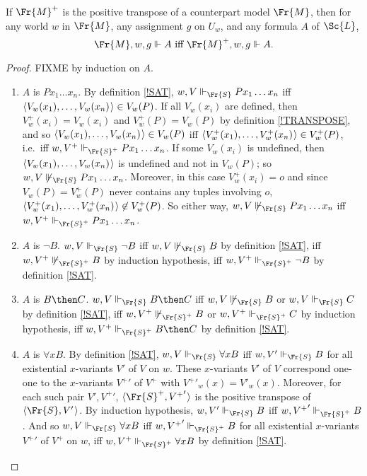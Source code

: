 \documentclass[11pt]{woarticle}
\theoremstyle{break}
\theoremstyle{nonumberplain}
\newcommand{\SAT}{\Vdash}
\newcommand{\1}{\;\,|\;\,}
\renewcommand{\t}[1]{\ensuremath{\langle #1  \makebox[.2ex]{}\rangle}}
\begin{document}
\begin{lemma}{\label{transpose}}
  If $\Fr{M}^{+}$ is the positive transpose of a counterpart model $\Fr{M}$,
  then for any world $w$ in $\Fr{M}$, any assignment $g$ on $U_{w}$, and any
  formula $A$ of $\Sc{L}$,
  \[
  \Fr{M},w,g \SAT A \text{ iff } \Fr{M}^{+},w,g \SAT A.
  \]
\end{lemma}
\begin{proof}
  FIXME
  by induction on $A$.
  \begin{enumerate}
  \item $A$ is $Px_1\ldots x_n$. By definition \ref{!SAT}, $w,V
    \SAT_{\Fr{S}} Px_1\ldots x_n$ iff $\t{V_w(x_1),\ldots,V_w(x_n)}
    \in V_w(P)$. If all $V_w(x_i)$ are defined, then $V_w^+(x_i) =
    V_w(x_i)$ and $V_w^+(P) = V_w(P)$ by definition \ref{!TRANSPOSE},
    and so $\t{V_w(x_1),\ldots,V_w(x_n)} \in V_w(P)$ iff
    $\t{V_w^+(x_1),\ldots,V_w^+(x_n)} \in V_w^+(P)$, i.e.\ iff $w,V^+
    \SAT_{\Fr{S}^+} Px_1\ldots x_n$. If some $V_w(x_i)$ is undefined,
    then $\t{V_w(x_1),\ldots,V_w(x_n)}$ is undefined and not in
    $V_w(P)$; so $w,V \not\SAT_{\Fr{S}} Px_1\ldots x_n$. Moreover, in
    this case $V^+_w(x_i) = o$ and since $V_w(P) = V_w^+(P)$ never
    contains any tuples involving $o$,
    $\t{V_w^+(x_1),\ldots,V_w^+(x_n)} \not\in V_w^+(P)$. So either
    way, $w,V \not\SAT_{\Fr{S}} Px_1\ldots x_n$ iff $w,V^+
    \SAT_{\Fr{S}^+} Px_1\ldots x_n$.
  \item $A$ is $\neg B$.\; $w,V \SAT_{\Fr{S}} \neg B$ iff $w,V
    \not\SAT_{\Fr{S}} B$ by definition \ref{!SAT}, iff $w,V^+
    \not\SAT_{\Fr{S}^+} B$ by induction hypothesis, iff $w,V^+
    \SAT_{\Fr{S}^+} \neg B$ by definition \ref{!SAT}.
  \item $A$ is $B \then C$.\; $w,V \SAT_{\Fr{S}} B \then C$ iff $w,V
    \not\SAT_{\Fr{S}} B$ or $w,V \SAT_{\Fr{S}} C$ by definition
    \ref{!SAT}, iff $w,V^+ \not\SAT_{\Fr{S}^+} B$ or $w,V^+
    \SAT_{\Fr{S}^+} C$ by induction hypothesis, iff $w,V^+
    \SAT_{\Fr{S}^+} B \then C$ by definition \ref{!SAT}.
  \item $A$ is $\forall x B$.\; By definition \ref{!SAT}, $w,V
    \SAT_{\Fr{S}} \forall x B$ iff $w,V' \SAT_{\Fr{S}} B$ for all
    existential $x$-variants $V'$ of $V$ on $w$. These $x$-variants
    $V'$ of $V$ correspond one-one to the $x$-variants ${V^+}'$ of
    $V^+$ with ${V^+}'_w(x) = V'_w(x)$. Moreover, for each such pair
    $V', {V^+}'$, $\t{\Fr{S}^+,{V^+}'}$ is the positive transpose of
    $\t{\Fr{S},V'}$. By induction hypothesis, $w,V' \SAT_{\Fr{S}} B$
    iff $w,{V^+}' \SAT_{\Fr{S}^+} B$. And so $w,V \SAT_{\Fr{S}}
    \forall x B$ iff $w,{V^+}' \SAT_{\Fr{S}^+} B$ for all existential
    $x$-variants ${V^+}'$ of $V^+$ on $w$, iff $w,V^+ \SAT_{\Fr{S}^+}
    \forall x B$ by definition \ref{!SAT}.


\end{enumerate}
\end{proof}
\end{document}

